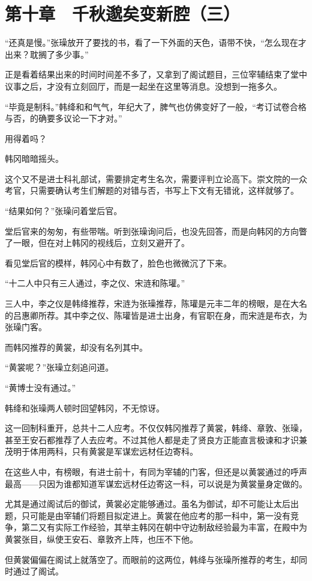 \section{第十章　千秋邈矣变新腔（三）}

“还真是慢。”张璪放开了要找的书，看了一下外面的天色，语带不快，“怎么现在才出来？耽搁了多少事。”

正是看着结果出来的时间时间差不多了，又拿到了阁试题目，三位宰辅结束了堂中议事之后，才没有立刻回厅，而是一起坐在这里等消息。没想到一拖多久。

“毕竟是制科。”韩绛和和气气，年纪大了，脾气也仿佛变好了一般，“考订试卷合格与否，的确要多议论一下才对。”

用得着吗？

韩冈暗暗摇头。

这个又不是进士科礼部试，需要排定考生名次，需要评判立论高下。崇文院的一众考官，只需要确认考生们解题的对错与否，书写上下文有无错讹，这样就够了。

“结果如何？”张璪问着堂后官。

堂后官来的匆匆，有些带喘。听到张璪询问后，也没先回答，而是向韩冈的方向瞥了一眼，但在对上韩冈的视线后，立刻又避开了。

看见堂后官的模样，韩冈心中有数了，脸色也微微沉了下来。

“十二人中只有三人通过，李之仪、宋涟和陈瓘。”

三人中，李之仪是韩绛推荐，宋涟为张璪推荐，陈瓘是元丰二年的榜眼，是在大名的吕惠卿所荐。其中李之仪、陈瓘皆是进士出身，有官职在身，而宋涟是布衣，为张璪门客。

而韩冈推荐的黄裳，却没有名列其中。

“黄裳呢？”张璪立刻追问道。

“黄博士没有通过。”

韩绛和张璪两人顿时回望韩冈，不无惊讶。

这一回制科重开，总共十二人应考。不仅仅韩冈推荐了黄裳，韩绛、章敦、张璪，甚至王安石都推荐了人去应考。不过其他人都是走了贤良方正能直言极谏和才识兼茂明于体用两科，只有黄裳是军谋宏远材任边寄科。

在这些人中，有榜眼，有进士前十，有同为宰辅的门客，但还是以黄裳通过的呼声最高——只因为谁都知道军谋宏远材任边寄这一科，可以说是为黄裳量身定做的。

尤其是通过阁试后的御试，黄裳必定能够通过。虽名为御试，却不可能让太后出题，只可能是由宰辅们将题目拟定进上。黄裳在他应考的那一科中，第一没有竞争，第二又有实际工作经验，其举主韩冈在朝中守边制敌经验最为丰富，在殿中为黄裳张目，纵使王安石、章敦齐上阵，也压不下他。

但黄裳偏偏在阁试上就落空了。而眼前的这两位，韩绛与张璪所推荐的考生，却同时通过了阁试。

